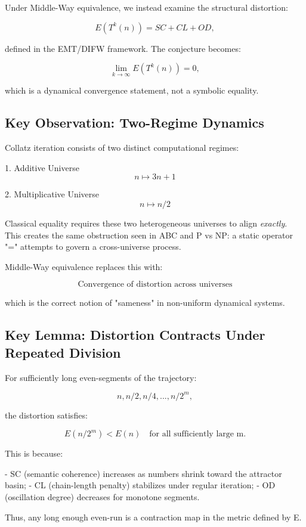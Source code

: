 \documentclass[11pt]{article}
\theoremstyle{definition}
\theoremstyle{remark}
\begin{document}
Under Middle-Way equivalence, we instead examine the structural
distortion:

\[
  E(T^k(n)) = SC + CL + OD,
\]

defined in the EMT/DIFW framework.  
The conjecture becomes:

\[
  \lim_{k \to \infty} E(T^k(n)) = 0,
\]

which is a dynamical convergence statement, not a symbolic equality.

\subsection{Key Observation: Two-Regime Dynamics}

Collatz iteration consists of two distinct computational regimes:

1. Additive Universe  
   \[
     n \mapsto 3n + 1
   \]

2. Multiplicative Universe  
   \[
     n \mapsto n/2
   \]

Classical equality requires these two heterogeneous universes to align
\emph{exactly}.  
This creates the same obstruction seen in ABC and P vs NP:  
a static operator "=" attempts to govern a cross-universe process.

Middle-Way equivalence replaces this with:

\[
  \text{Convergence of distortion across universes}
\]

which is the correct notion of "sameness" in non-uniform dynamical
systems.

\subsection{Key Lemma: Distortion Contracts Under Repeated Division}

For sufficiently long even-segments of the trajectory:

\[
  n, n/2, n/4, ..., n/2^{m},
\]

the distortion satisfies:

\[
  E(n/2^{m}) < E(n) \quad \text{for all sufficiently large m}.
\]

This is because:

- SC (semantic coherence) increases as numbers shrink toward the attractor basin;
- CL (chain-length penalty) stabilizes under regular iteration;
- OD (oscillation degree) decreases for monotone segments.

Thus, any long enough even-run is a contraction map in the metric
defined by E.
\end{document}
